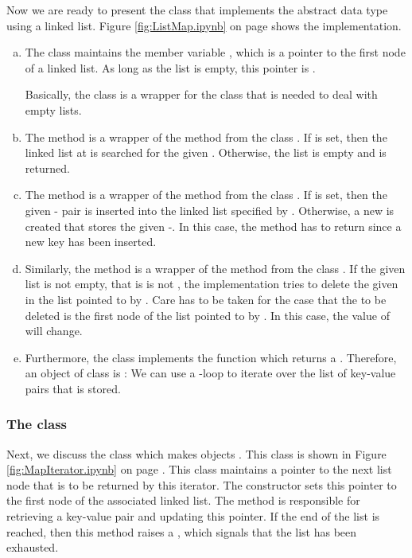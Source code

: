 Now we are ready to present the class  that implements the abstract data type  using a
linked list.  Figure \ref{fig:ListMap.ipynb} on page \pageref{fig:ListMap.ipynb} shows the implementation.
\begin{enumerate}[(a)]
\item The class maintains the  member variable , which is a pointer to the first node of a linked
      list.  As long as the list is empty, this pointer is .

      Basically, the class  is a wrapper for the class  that is needed to deal
      with empty lists.
\item The method  is a wrapper of the method  from the class .
      If  is set, then the linked list at  is searched for the given .
      Otherwise, the list is empty and  is returned.
\item The method  is a wrapper of the method  from the class .
      If  is set, then the given - pair is inserted into the
      linked list specified by .
      Otherwise, a new  is created that stores the given  -.
      In this case, the method has to return  since a new key has been inserted.
\item Similarly, the method  is a wrapper of the method  from the class
      .  If the given list is not empty, that is  is not ,
      the implementation tries to delete the given  in the list pointed to by .
      Care has to be taken for the case that the  to be deleted is the first node of the
      list pointed to by .  In this case, the value of  will change.
\item Furthermore, the class implements the function  which returns a
      .  Therefore, an object of class  is : We can
      use a -loop to iterate over the list of key-value pairs that is stored.  
\end{enumerate}
    
\subsubsection{The class }
Next, we discuss the class  which makes  objects .
This class is shown in Figure \ref{fig:MapIterator.ipynb} on page \pageref{fig:MapIterator.ipynb}.
This class maintains a pointer to the next list node that is to be returned by this iterator.
The constructor sets this pointer to the first node of the associated linked list.
The method  is responsible for retrieving a key-value pair and updating this pointer.
If the end of the list is reached, then this method raises a , which signals that the
list has been exhausted.

